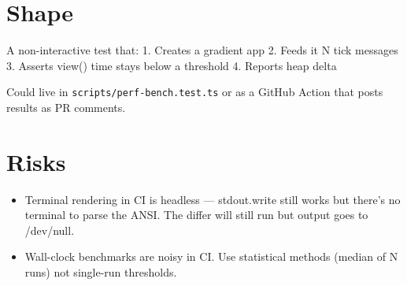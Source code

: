 \section{Shape}\label{record-320-shape}

A non-interactive test that: 1. Creates a gradient app 2. Feeds it N tick messages 3. Asserts view() time stays below a threshold 4. Reports heap delta

Could live in \texttt{s\allowbreak{}c\allowbreak{}r\allowbreak{}i\allowbreak{}p\allowbreak{}t\allowbreak{}s\allowbreak{}/\allowbreak{}p\allowbreak{}e\allowbreak{}r\allowbreak{}f\allowbreak{}-\allowbreak{}b\allowbreak{}e\allowbreak{}n\allowbreak{}c\allowbreak{}h\allowbreak{}.\allowbreak{}t\allowbreak{}e\allowbreak{}s\allowbreak{}t\allowbreak{}.\allowbreak{}t\allowbreak{}s} or as a GitHub Action that posts results as PR comments.

\section{Risks}\label{record-320-risks}

\begin{itemize}
\tightlist
\item
  Terminal rendering in CI is headless --- stdout.write still works but there's no terminal to parse the ANSI. The differ will still run but output goes to /dev/null.
\item
  Wall-clock benchmarks are noisy in CI. Use statistical methods (median of N runs) not single-run thresholds.
\end{itemize}

